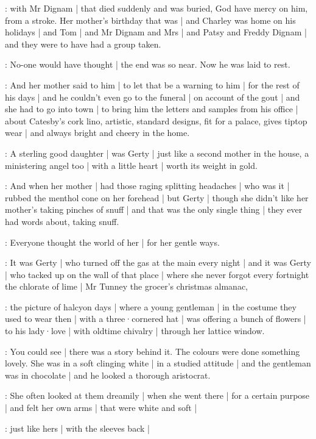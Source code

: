 \gertyReal:
with Mr Dignam |
that died suddenly and was buried,
God have mercy on him,
from a stroke.
Her mother's birthday that was |
and Charley was home on his holidays |
and Tom |
and Mr Dignam and Mrs |
and Patsy and Freddy Dignam |
and they were to have had a group taken.

\gertyNovel:
No-one would have thought |
the end was so near.
Now he was laid to rest.

\gertyReal:
And her mother said to him |%
to let that be a warning to him |
for the rest of his days |
and he couldn't even go to the funeral |
on account of the gout |
and she had to go into town |
to bring him the letters and samples
from his office |
about Catesby's cork lino,
artistic,
standard designs,
fit for a palace,
gives tiptop wear |
and always bright and cheery in the home.

\gertyNovel:
A sterling good daughter |
was Gerty |
just like a second mother in the house,
a ministering angel too |
with a little heart |
worth its weight in gold.

\gertyReal:
And when her mother |
had those raging splitting headaches |
who was it |
rubbed the menthol cone on her forehead |
but Gerty |
though she didn't like her mother's taking pinches of snuff |
and that was the only single thing |
they ever had words about,
taking snuff.%

\gertyNovel:
Everyone thought the world of her |
for her gentle ways.

\gertyReal:
It was Gerty |
who turned off the gas at the main every night |
and it was Gerty |
who tacked up on the wall of that place |
where she never forgot every fortnight the chlorate of lime |
Mr Tunney the grocer's christmas almanac,

\gertyNovel:
the picture of halcyon days |
where a young gentleman |
in the costume they used to wear then |
with a three·cornered hat |
was offering a bunch of flowers |
to his lady·love |
with oldtime chivalry |
through her lattice window.

\gertyRomantic:
You could see |
there was a story behind it.
The colours were done something lovely.
She was in a soft clinging white |
in a studied attitude |
and the gentleman was in chocolate |
and he looked a thorough aristocrat.

\gertyReal:
She often looked at them dreamily |%
when she went there |
for a certain purpose |
and felt her own arms |
that were white and soft |

\gertyRomantic:
just like hers |
with the sleeves back |

